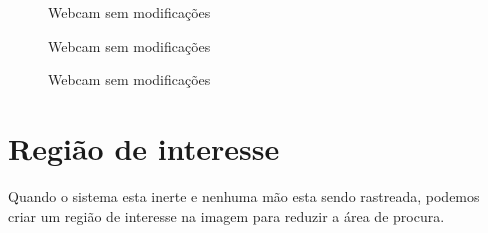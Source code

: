 \begin{figure}[ht!]
\centering
{}
  \caption{Webcam sem modificações}
  \label{fig:webcam03}
\end{figure} 

\begin{figure}[ht!]
\centering
{}
  \caption{Webcam sem modificações}
  \label{fig:webcam04}
\end{figure} 

\begin{figure}[ht!]
\centering
{}
  \caption{Webcam sem modificações}
  \label{fig:webcam05}
\end{figure} 

\section{Região de interesse}

Quando o sistema esta inerte e nenhuma mão esta sendo rastreada, podemos criar um região de interesse na imagem para reduzir a área de procura.
